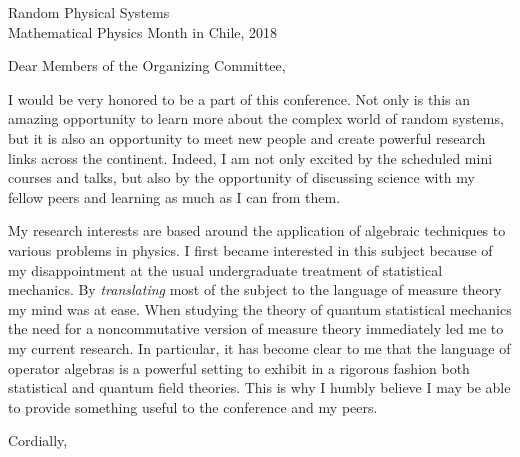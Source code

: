 \documentclass{letter}
\begin{document}
\begin{letter}{Random Physical Systems\\Mathematical Physics Month in Chile, 2018}

\opening{Dear Members of the Organizing Committee,}

I would be very honored to be a part of this conference. Not only is this an amazing opportunity to learn more about the complex world of random systems, but it is also an opportunity to meet new people and create powerful research links across the continent. Indeed, I am not only excited by the scheduled mini courses and talks, but also by the opportunity of discussing science with my fellow peers and learning as much as I can from them. 

My research interests are based around the application of algebraic techniques to various problems in physics. I first became interested in this subject because of my disappointment at the usual undergraduate treatment of statistical mechanics. By \textit{translating} most of the subject to the language of measure theory my mind was at ease. When studying the theory of quantum statistical mechanics the need for a noncommutative version of measure theory immediately led me to my current research. In particular, it has become clear to me that the language of operator algebras is a powerful setting to exhibit in a rigorous fashion both statistical and quantum field theories. This is why I humbly believe I may be able to provide something useful to the conference and my peers.  

\closing{Cordially,}

\end{letter}
\end{document}
